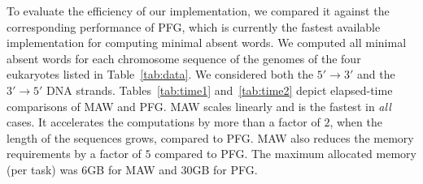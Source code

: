 \documentclass{llncs}
\begin{document}
  To evaluate the efficiency of our implementation, we compared it 
against the corresponding performance of \textsf{PFG}, which is currently
the fastest available implementation for computing minimal absent words.
  We computed all minimal absent words for each chromosome sequence of 
the genomes of the four eukaryotes listed in Table~\ref{tab:data}.
  We considered both the $5'\rightarrow3'$ and the $3'\rightarrow5'$ 
DNA strands.
  Tables~\ref{tab:time1} and~\ref{tab:time2} depict elapsed-time 
comparisons of \textsf{MAW} and \textsf{PFG}.
  \textsf{MAW} scales linearly and is the fastest in {\em all} cases.
  It accelerates the computations by more than a factor of $2$, when 
the length of the sequences grows, compared to \textsf{PFG}.
  \textsf{MAW} also reduces the memory requirements by a factor of $5$ compared to \textsf{PFG}.
  The maximum allocated memory (per task) was 6GB for \textsf{MAW} and 30GB for \textsf{PFG}.

\begin{table}[!ht]
\vspace{0.25cm}
\begin{center}
\qquad
{}
\end{center}
\caption{Elapsed-time comparison of \textsf{MAW} and \textsf{PFG} 
for computing all minimal absent words in the genome of 
{\em Arabidopsis thaliana} and {\em Drosophila melanogaster}}
\label{tab:time1}
\end{table}
\end{document}
